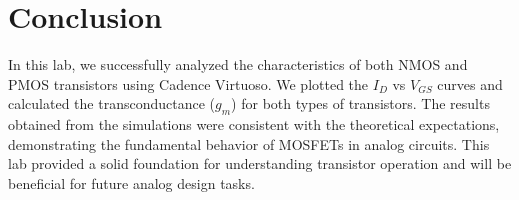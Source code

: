 \documentclass{AnantDocumentation}
\begin{document}
\clearpage
\section{Conclusion}
In this lab, we successfully analyzed the characteristics of both NMOS and PMOS transistors using Cadence Virtuoso. We plotted the $I_D$ vs $V_{GS}$ curves and calculated the transconductance ($g_m$) for both types of transistors. The results obtained from the simulations were consistent with the theoretical expectations, demonstrating the fundamental behavior of MOSFETs in analog circuits. This lab provided a solid foundation for understanding transistor operation and will be beneficial for future analog design tasks.
\end{document}
